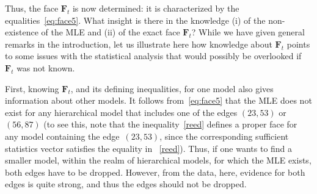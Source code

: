 \documentclass[aos,noinfoline]{imsart}
\newcommand{\Fbf}{\mathbf{F}}
\theoremstyle{remark}
\theoremstyle{definition}
\begin{document}
Thus, the face $\Fbf_{t}$ is now determined: it is characterized by the equalities~\eqref{eq:face5}.
  What insight is there in the knowledge (i) of the non-existence of the MLE and (ii) of the exact
  face $\Fbf_{t}$?  While we have given general remarks in the introduction, let us illustrate here  how knowledge about $\Fbf_{t}$ points to some issues with the statistical analysis that would
  possibly be overlooked if $\Fbf_{t}$ was not known.
  
First, knowing $\Fbf_{t}$, and its defining inequalities, for one model also gives information about other models.
It follows from~\eqref{eq:face5} that the MLE does not exist for any hierarchical model that includes one of the edges
$(23,53)$ or $(56,87)$ (to see this, note that the inequality~\eqref{reed} %
defines a proper face for any model containing the edge~$(23,53)$, since the corresponding sufficient statistics vector
satisfies the equality in ~\eqref{reed}).
Thus, if one wants to find a smaller model,  within
  the realm of hierarchical models, for which the MLE exists, both edges have to be dropped. However, from the data, here, evidence for both
  edges is quite strong, and thus the edges should not be dropped.
\end{document}

